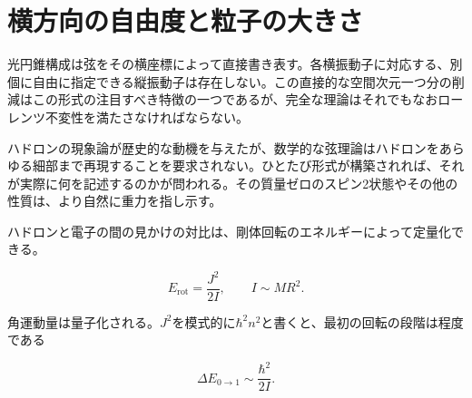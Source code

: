 \section{横方向の自由度と粒子の大きさ}

光円錐構成は弦をその横座標によって直接書き表す。各横振動子に対応する、別個に自由に指定できる縦振動子は存在しない。この直接的な空間次元一つ分の削減はこの形式の注目すべき特徴の一つであるが、完全な理論はそれでもなおローレンツ不変性を満たさなければならない。

\begin{classroomqa}
\end{classroomqa}

\begin{classroomqa}
\end{classroomqa}

ハドロンの現象論が歴史的な動機を与えたが、数学的な弦理論はハドロンをあらゆる細部まで再現することを要求されない。ひとたび形式が構築されれば、それが実際に何を記述するのかが問われる。その質量ゼロのスピン2状態やその他の性質は、より自然に重力を指し示す。

ハドロンと電子の間の見かけの対比は、剛体回転のエネルギーによって定量化できる。

\begin{equation}
  E_{\mathrm{rot}}=\frac{J^2}{2I},
  \qquad
  I\sim MR^2.
  \label{eq:l01-rotational-energy}
\end{equation}

角運動量は量子化される。\(J^2\)を模式的に\(\hbar^2 n^2\)と書くと、最初の回転の段階は程度である

\begin{equation}
  \Delta E_{0\to1}\sim\frac{\hbar^2}{2I}.
  \label{eq:l01-first-rotational-step}
\end{equation}

